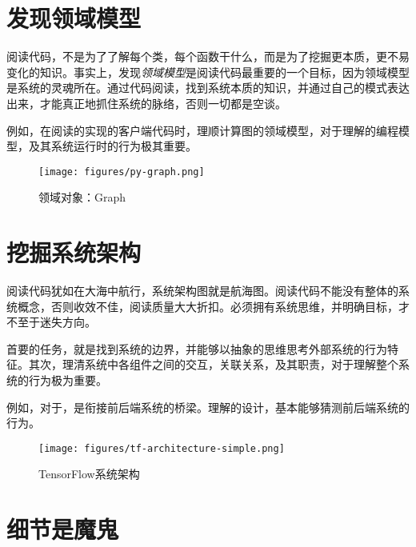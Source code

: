\section{发现领域模型}

\begin{content}

阅读代码，不是为了了解每个类，每个函数干什么，而是为了挖掘更本质，更不易变化的知识。事实上，发现\emph{领域模型}是阅读代码最重要的一个目标，因为领域模型是系统的灵魂所在。通过代码阅读，找到系统本质的知识，并通过自己的模式表达出来，才能真正地抓住系统的脉络，否则一切都是空谈。

例如，在阅读\tf{}的实现的客户端代码时，理顺计算图的领域模型，对于理解的编程模型，及其系统运行时的行为极其重要。

\begin{figure}[!htbp]
\centering
\texttt{[image: figures/py-graph.png]}
\caption{领域对象：Graph}
 \label{fig:py-graph}
\end{figure}

\end{content}

\section{挖掘系统架构}

\begin{content}

阅读代码犹如在大海中航行，系统架构图就是航海图。阅读代码不能没有整体的系统概念，否则收效不佳，阅读质量大大折扣。必须拥有系统思维，并明确目标，才不至于迷失方向。

首要的任务，就是找到系统的边界，并能够以抽象的思维思考外部系统的行为特征。其次，理清系统中各组件之间的交互，关联关系，及其职责，对于理解整个系统的行为极为重要。

例如，对于，是衔接前后端系统的桥梁。理解的设计，基本能够猜测前后端系统的行为。

\begin{figure}[!h]
\centering
\texttt{[image: figures/tf-architecture-simple.png]}
\caption{TensorFlow系统架构}
 \label{fig:tf-architecture-simple}
\end{figure}

\end{content}

\section{细节是魔鬼}

